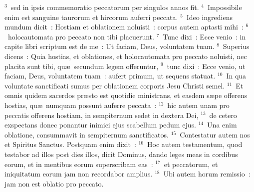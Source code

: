 ${}^{3}$~sed in ipsis commemoratio peccatorum per singulos annos fit.
${}^{4}$~Impossibile enim est sanguine taurorum et hircorum auferri peccata.
${}^{5}$~Ideo ingrediens mundum dicit~: Hostiam et oblationem noluisti~: corpus autem aptasti mihi~:
${}^{6}$~holocautomata pro peccato non tibi placuerunt.
${}^{7}$~Tunc dixi~: Ecce venio~: in capite libri scriptum est de me~: Ut faciam, Deus, voluntatem tuam.
${}^{8}$~Superius dicens~: Quia hostias, et oblationes, et holocautomata pro peccato noluisti, nec placita sunt tibi, qu\ae\ secundum legem offeruntur,
${}^{9}$~tunc dixi~: Ecce venio, ut faciam, Deus, voluntatem tuam~: aufert primum, ut sequens statuat.
${}^{10}$~In qua voluntate sanctificati sumus per oblationem corporis Jesu Christi semel.
${}^{11}$~Et omnis quidem sacerdos pr\ae sto est quotidie ministrans, et easdem s\ae pe offerens hostias, qu\ae\ numquam possunt auferre peccata~:
${}^{12}$~hic autem unam pro peccatis offerens hostiam, in sempiternum sedet in dextera Dei,
${}^{13}$~de cetero exspectans donec ponantur inimici ejus scabellum pedum ejus.
${}^{14}$~Una enim oblatione, consummavit in sempiternum sanctificatos.
${}^{15}$~Contestatur autem nos et Spiritus Sanctus. Postquam enim dixit~:
${}^{16}$~Hoc autem testamentum, quod testabor ad illos post dies illos, dicit Dominus, dando leges meas in cordibus eorum, et in mentibus eorum superscribam eas~:
${}^{17}$~et peccatorum, et iniquitatum eorum jam non recordabor amplius.
${}^{18}$~Ubi autem horum remissio~: jam non est oblatio pro peccato.


